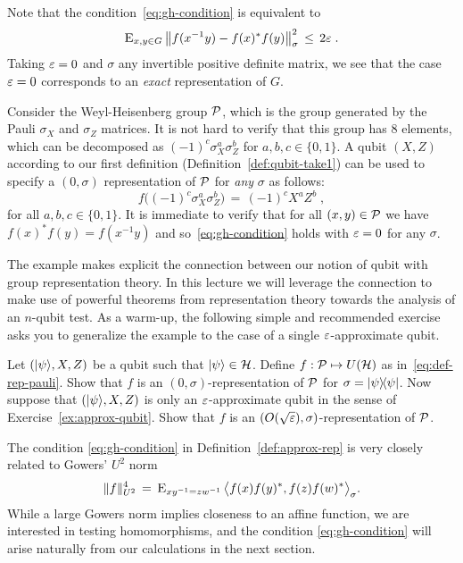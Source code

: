 Note that the condition~\eqref{eq:gh-condition} is equivalent to 
\begin{equation}\label{eq:gh-condition-2}
\textsc{E}_{x,y\in G} \, \big\| f(x^{-1}y) - f(x)^*f(y) \big\|_\sigma^2 \,\leq\, 2\varepsilon\;.
\end{equation}
Taking $\varepsilon=0$ and $\sigma$ any invertible positive definite matrix, we see that the case $\varepsilon=0$ corresponds to an \emph{exact} representation of $G$. 

\begin{example}\label{ex:wh-1}
Consider the Weyl-Heisenberg group $\mathcal{P}$, which is the group generated by the Pauli $\sigma_X$ and $\sigma_Z$ matrices. It is not hard to verify that this group has $8$ elements, which can be decomposed as $(-1)^c \sigma_X^a \sigma_Z^b$ for $a,b,c\in\{0,1\}$. 
A qubit $(X,Z)$ according to our first definition (Definition~\ref{def:qubit-take1}) can be used to specify a $(0,\sigma)$ representation of $\mathcal{P}$ for \emph{any} $\sigma$ as follows:
\begin{equation}\label{eq:def-rep-pauli}
 f\big((-1)^c \sigma_X^a \sigma_Z^b\big) \,=\, (-1)^c X^a Z^b\;,
\end{equation}
for all $a,b,c\in\{0,1\}$. It is immediate to verify that for all $(x,y)\in \mathcal{P}$ we have $f(x)^*f(y)=f(x^{-1}y)$ and so~\eqref{eq:gh-condition} holds with $\varepsilon=0$ for any $\sigma$.
\end{example}

The example makes explicit the connection between our notion of qubit with group representation theory. In this lecture we will leverage the connection to make use of powerful theorems from representation theory towards the analysis of an $n$-qubit test. As a warm-up, 
the following simple and recommended exercise asks you to generalize the example to the case of a single $\varepsilon$-approximate qubit. 

\begin{exercise}\label{ex:wh-2}
Let $(|\psi\rangle,X,Z)$ be a qubit such that $|\psi\rangle\in \mathcal{H}$. Define $f:\mathcal{P} \mapsto U(\mathcal{H})$ as in~\eqref{eq:def-rep-pauli}. Show that $f$ is an $(0,\sigma)$-representation of $\mathcal{P}$ for $\sigma = |{\psi}\rangle\!\langle{\psi}|$. Now suppose that $(|\psi\rangle,X,Z)$ is only an $\varepsilon$-approximate qubit in the sense of Exercise~\ref{ex:approx-qubit}. Show that $f$ is an $(O(\sqrt{\varepsilon}),\sigma)$-representation of $\mathcal{P}$. 
\end{exercise}

\begin{remark}
The condition \eqref{eq:gh-condition} in Definition~\ref{def:approx-rep} is very closely related to Gowers' $U^2$ norm
$$\|f\|_{U^2}^4 \,=\, \textsc{E}_{xy^{-1}=zw^{-1}}\, \big\langle f(x)f(y)^* ,f(z)f(w)^* \big\rangle_\sigma.$$
While a large Gowers norm implies closeness to an affine function, we are interested in testing homomorphisms, and the condition \eqref{eq:gh-condition} will arise naturally from our calculations in the next section. 
\end{remark}

